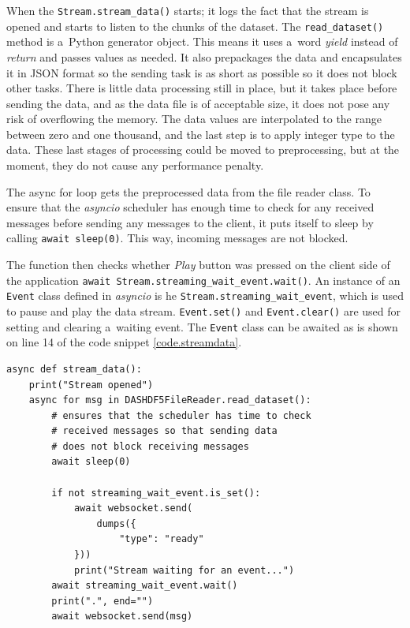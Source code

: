 When the \texttt{Stream.stream\_data()} starts; it logs the fact that the stream is opened and starts to listen to the chunks of the dataset. The \texttt{read\_dataset()} method is a~Python generator object. This means it uses a~word \textit{yield} instead of \textit{return} and passes values as needed. It also prepackages the data and encapsulates it in JSON format so the sending task is as short as possible so it does not block other tasks. There is little data processing still in place, but it takes place before sending the data, and as the data file is of acceptable size, it does not pose any risk of overflowing the memory. The data values are interpolated to the range between zero and one thousand, and the last step is to apply integer type to the data. These last stages of processing could be moved to preprocessing, but at the moment, they do not cause any performance penalty.

The async for loop gets the preprocessed data from the file reader class. To ensure that the \textit{asyncio} scheduler has enough time to check for any received messages before sending any messages to the client, it puts itself to sleep by calling \texttt{await sleep(0)}. This way, incoming messages are not blocked. 

The function then checks whether \textit{Play} button was pressed on the client side of the application \texttt{await Stream.streaming\_wait\_event.wait()}. An instance of an \texttt{Event} class defined in \textit{asyncio} is he \texttt{Stream.streaming\_wait\_event}, which is used to pause and play the data stream. \texttt{Event.set()} and \texttt{Event.clear()} are used for setting and clearing a~waiting event. The \texttt{Event} class can be awaited as is shown on line 14 of the code snippet \ref{code.streamdata}.

\begin{lstlisting}[style=py, caption={Data streaming function implementation.}, label=code.streamdata]
async def stream_data():
    print("Stream opened")
    async for msg in DASHDF5FileReader.read_dataset():
        # ensures that the scheduler has time to check
        # received messages so that sending data 
        # does not block receiving messages
        await sleep(0)

        if not streaming_wait_event.is_set():
            await websocket.send(
                dumps({
                    "type": "ready"
            }))
            print("Stream waiting for an event...")
        await streaming_wait_event.wait()
        print(".", end="")
        await websocket.send(msg)
\end{lstlisting}


